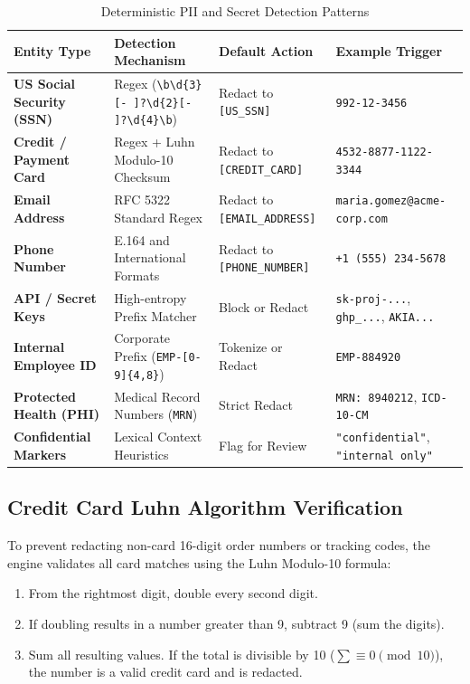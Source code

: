 \documentclass[11pt,a4paper]{article}
\begin{document}
\begin{table}[h]
\caption{Deterministic PII and Secret Detection Patterns}
\label{tab:pii_patterns}
\centering
\begin{tabularx}{\textwidth}{@{}lllX@{}}
\toprule
\textbf{Entity Type} & \textbf{Detection Mechanism} & \textbf{Default Action} & \textbf{Example Trigger} \\ \midrule
\textbf{US Social Security (SSN)} & Regex (\texttt{\textbackslash b\textbackslash d\{3\}[- ]?\textbackslash d\{2\}[- ]?\textbackslash d\{4\}\textbackslash b}) & Redact to \texttt{[US\_SSN]} & \texttt{992-12-3456} \\
\textbf{Credit / Payment Card} & Regex + Luhn Modulo-10 Checksum & Redact to \texttt{[CREDIT\_CARD]} & \texttt{4532-8877-1122-3344} \\
\textbf{Email Address} & RFC 5322 Standard Regex & Redact to \texttt{[EMAIL\_ADDRESS]} & \texttt{maria.gomez@acme-corp.com} \\
\textbf{Phone Number} & E.164 and International Formats & Redact to \texttt{[PHONE\_NUMBER]} & \texttt{+1 (555) 234-5678} \\
\textbf{API / Secret Keys} & High-entropy Prefix Matcher & Block or Redact & \texttt{sk-proj-...}, \texttt{ghp\_...}, \texttt{AKIA...} \\
\textbf{Internal Employee ID} & Corporate Prefix (\texttt{EMP-[0-9]\{4,8\}}) & Tokenize or Redact & \texttt{EMP-884920} \\
\textbf{Protected Health (PHI)} & Medical Record Numbers (\texttt{MRN}) & Strict Redact & \texttt{MRN: 8940212}, \texttt{ICD-10-CM} \\
\textbf{Confidential Markers} & Lexical Context Heuristics & Flag for Review & \texttt{"confidential"}, \texttt{"internal only"} \\ \bottomrule
\end{tabularx}
\end{table}

\subsection{Credit Card Luhn Algorithm Verification}
To prevent redacting non-card 16-digit order numbers or tracking codes, the engine validates all card matches using the Luhn Modulo-10 formula:

\begin{enumerate}
    \item From the rightmost digit, double every second digit.
    \item If doubling results in a number greater than 9, subtract 9 (sum the digits).
    \item Sum all resulting values. If the total is divisible by 10 ($\sum \equiv 0 \pmod{10}$), the number is a valid credit card and is redacted.
\end{enumerate}
\end{document}
